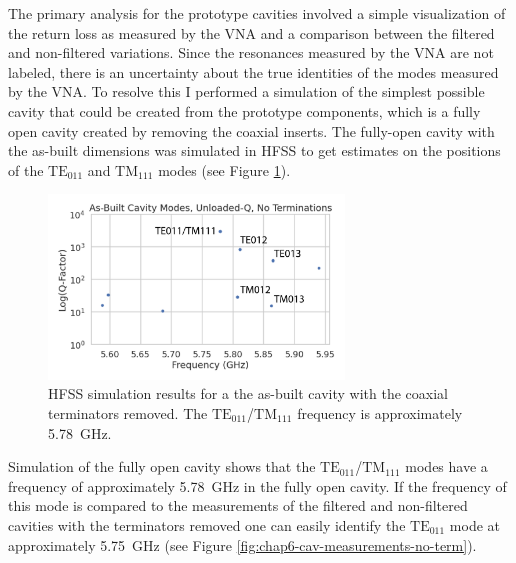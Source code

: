 The primary analysis for the prototype cavities involved a simple visualization of the return loss as measured by the VNA and a comparison between the filtered and non-filtered variations. Since the resonances measured by the VNA are not labeled, there is an uncertainty about the true identities of the modes measured by the VNA. To resolve this I performed a simulation of the simplest possible cavity that could be created from the prototype components, which is a fully open cavity created by removing the coaxial inserts. The fully-open cavity with the as-built dimensions was simulated in HFSS to get estimates on the positions of the $\mathrm{TE}_{011}$ and $\mathrm{TM}_{111}$ modes (see Figure \ref{fig:chap6-fully-open-cavity-sim}).

\begin{figure}[htbp]
    \centering
    \includegraphics*[width=0.7\textwidth]{figs/Chapter-6/230612_simulated_toy_cav_no_term_modes_annotated.png}
    \caption{\label{fig:chap6-fully-open-cavity-sim} HFSS simulation results for a the as-built cavity with the coaxial terminators removed. The $\mathrm{TE}_{011}$/$\mathrm{TM}_{111}$ frequency is approximately 5.78~GHz.}
\end{figure}

Simulation of the fully open cavity shows that the $\mathrm{TE}_{011}$/$\mathrm{TM}_{111}$ modes have a frequency of approximately 5.78~GHz in the fully open cavity. If the frequency of this mode is compared to the measurements of the filtered and non-filtered cavities with the terminators removed one can easily identify the $\mathrm{TE}_{011}$ mode at approximately 5.75~GHz (see Figure \ref{fig:chap6-cav-measurements-no-term}).

